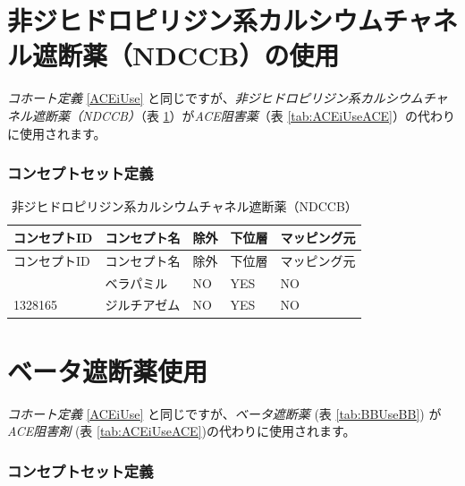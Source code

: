 \documentclass[
  11pt]{book}
\theoremstyle{definition}
\theoremstyle{definition}
\theoremstyle{definition}
\theoremstyle{definition}
\theoremstyle{remark}
\begin{document}
\section{非ジヒドロピリジン系カルシウムチャネル遮断薬（NDCCB）の使用}\label{ndCCBUse}

\emph{コホート定義} \ref{ACEiUse} と同じですが、\emph{非ジヒドロピリジン系カルシウムチャネル遮断薬（NDCCB）}（表 \ref{tab:ndCCBUsendCCB}）が\emph{ACE阻害薬}（表 \ref{tab:ACEiUseACE}）の代わりに使用されます。

\subsubsection*{コンセプトセット定義}\label{ux30b3ux30f3ux30bbux30d7ux30c8ux30bbux30c3ux30c8ux5b9aux7fa9-10}

\begin{longtable}[]{@{}lllll@{}}
\caption{\label{tab:ndCCBUsendCCB} 非ジヒドロピリジン系カルシウムチャネル遮断薬（NDCCB）}\tabularnewline
\toprule\noalign{}
コンセプトID & コンセプト名 & 除外 & 下位層 & マッピング元 \\
\midrule\noalign{}
\endfirsthead
\toprule\noalign{}
コンセプトID & コンセプト名 & 除外 & 下位層 & マッピング元 \\
\midrule\noalign{}
\endhead
\bottomrule\noalign{}
\endlastfoot
1307863 & ベラパミル & NO & YES & NO \\
1328165 & ジルチアゼム & NO & YES & NO \\
\end{longtable}

\section{ベータ遮断薬使用}\label{BBUse}

\emph{コホート定義} \ref{ACEiUse} と同じですが、\emph{ベータ遮断薬} (表 \ref{tab:BBUseBB}) が \emph{ACE阻害剤} (表 \ref{tab:ACEiUseACE})の代わりに使用されます。

\subsubsection*{コンセプトセット定義}\label{ux30b3ux30f3ux30bbux30d7ux30c8ux30bbux30c3ux30c8ux5b9aux7fa9-11}
\end{document}
